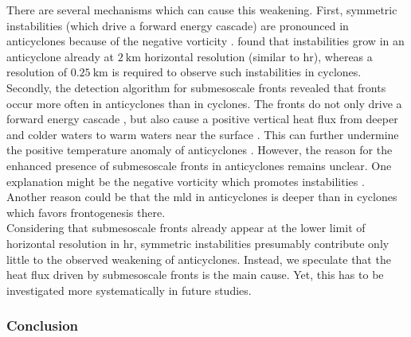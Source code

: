 There are several mechanisms which can cause this weakening. First, symmetric instabilities (which drive a forward energy cascade) are pronounced in anticyclones because of the negative vorticity \autocite{thomas-2013-classification-sym-inst}. \Textcite{brannigan-2017} found that instabilities grow in an anticyclone already at $\SI{2}{\kilo\metre}$ horizontal resolution (similar to \ac{hr}), whereas a resolution of $\SI{0.25}{\kilo\metre}$ is required to observe such instabilities in cyclones. Secondly, the detection algorithm for submesoscale fronts revealed that fronts occur more often in anticyclones than in cyclones. The fronts do not only drive a forward energy cascade \autocite{dasaro-subm-dissipation-obs}, but also cause a positive vertical heat flux from deeper and colder waters to warm waters near the surface \autocite{klein-2019-review-subm}. This can further undermine the positive temperature anomaly of anticyclones \autocite{frenger-2015-so-eddy-phen}. However, the reason for the enhanced presence of submesoscale fronts in anticyclones remains unclear. One explanation might be the negative vorticity which promotes instabilities \autocite{thomas-2013-classification-sym-inst}. Another reason could be that the \ac{mld} in anticyclones is deeper than in cyclones which favors frontogenesis there.\\
Considering that submesoscale fronts already appear at the lower limit of horizontal resolution in \ac{hr}, symmetric instabilities presumably contribute only little to the observed weakening of anticyclones. Instead, we speculate that the heat flux driven by submesoscale fronts is the main cause. Yet, this has to be investigated more systematically in future studies.

\subsubsection{Conclusion}

